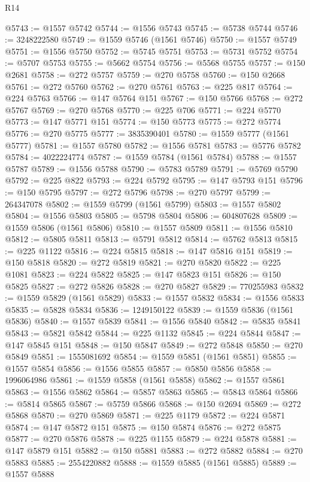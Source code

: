 \begin{lexlean}{R14}
\begin{coremodule}
@5743 := @1557 @5742
@5744 := @1556 @5743
@5745 := @5738 @5744
@5746 := 3248222580
@5749 := @1559 @5746 (@1561 @5746)
@5750 := @1557 @5749
@5751 := @1556 @5750
@5752 := @5745 @5751
@5753 := @5731 @5752
@5754 := @5707 @5753
@5755 := @5662 @5754
@5756 := @5568 @5755
@5757 := @150 @2681
@5758 := @272 @5757
@5759 := @270 @5758
@5760 := @150 @2668
@5761 := @272 @5760
@5762 := @270 @5761
@5763 := @225 @817
@5764 := @224 @5763
@5766 := @147 @5764 @151
@5767 := @150 @5766
@5768 := @272 @5767
@5769 := @270 @5768
@5770 := @225 @706
@5771 := @224 @5770
@5773 := @147 @5771 @151
@5774 := @150 @5773
@5775 := @272 @5774
@5776 := @270 @5775
@5777 := 3835390401
@5780 := @1559 @5777 (@1561 @5777)
@5781 := @1557 @5780
@5782 := @1556 @5781
@5783 := @5776 @5782
@5784 := 4022224774
@5787 := @1559 @5784 (@1561 @5784)
@5788 := @1557 @5787
@5789 := @1556 @5788
@5790 := @5783 @5789
@5791 := @5769 @5790
@5792 := @225 @822
@5793 := @224 @5792
@5795 := @147 @5793 @151
@5796 := @150 @5795
@5797 := @272 @5796
@5798 := @270 @5797
@5799 := 264347078
@5802 := @1559 @5799 (@1561 @5799)
@5803 := @1557 @5802
@5804 := @1556 @5803
@5805 := @5798 @5804
@5806 := 604807628
@5809 := @1559 @5806 (@1561 @5806)
@5810 := @1557 @5809
@5811 := @1556 @5810
@5812 := @5805 @5811
@5813 := @5791 @5812
@5814 := @5762 @5813
@5815 := @225 @1122
@5816 := @224 @5815
@5818 := @147 @5816 @151
@5819 := @150 @5818
@5820 := @272 @5819
@5821 := @270 @5820
@5822 := @225 @1081
@5823 := @224 @5822
@5825 := @147 @5823 @151
@5826 := @150 @5825
@5827 := @272 @5826
@5828 := @270 @5827
@5829 := 770255983
@5832 := @1559 @5829 (@1561 @5829)
@5833 := @1557 @5832
@5834 := @1556 @5833
@5835 := @5828 @5834
@5836 := 1249150122
@5839 := @1559 @5836 (@1561 @5836)
@5840 := @1557 @5839
@5841 := @1556 @5840
@5842 := @5835 @5841
@5843 := @5821 @5842
@5844 := @225 @1132
@5845 := @224 @5844
@5847 := @147 @5845 @151
@5848 := @150 @5847
@5849 := @272 @5848
@5850 := @270 @5849
@5851 := 1555081692
@5854 := @1559 @5851 (@1561 @5851)
@5855 := @1557 @5854
@5856 := @1556 @5855
@5857 := @5850 @5856
@5858 := 1996064986
@5861 := @1559 @5858 (@1561 @5858)
@5862 := @1557 @5861
@5863 := @1556 @5862
@5864 := @5857 @5863
@5865 := @5843 @5864
@5866 := @5814 @5865
@5867 := @5759 @5866
@5868 := @150 @2694
@5869 := @272 @5868
@5870 := @270 @5869
@5871 := @225 @1179
@5872 := @224 @5871
@5874 := @147 @5872 @151
@5875 := @150 @5874
@5876 := @272 @5875
@5877 := @270 @5876
@5878 := @225 @1155
@5879 := @224 @5878
@5881 := @147 @5879 @151
@5882 := @150 @5881
@5883 := @272 @5882
@5884 := @270 @5883
@5885 := 2554220882
@5888 := @1559 @5885 (@1561 @5885)
@5889 := @1557 @5888

\end{coremodule}
\end{lexlean}
